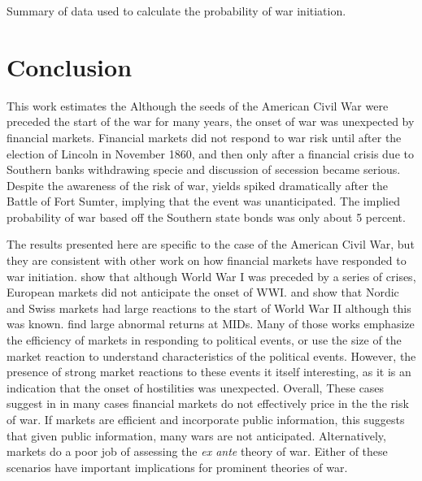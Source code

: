 \begin{table}
  \centering
  
  \caption{Summary of data used to calculate the probability of war initiation.}
\label{acw_onset:tab:prwar1}
\end{table}

\section{Conclusion}
\label{acw_onset:sec:conclusion}

This work estimates the
Although the seeds of the American Civil War were preceded the start of the war for many years, the onset of war was unexpected by financial markets.
Financial markets did not respond to war risk until after the election of Lincoln in November 1860, and then only after a financial crisis due to Southern banks withdrawing specie and discussion of secession became serious.
Despite the awareness of the risk of war, yields spiked dramatically after the Battle of Fort Sumter, implying that the event was unanticipated.
The implied probability of war based off the Southern state bonds was only about 5 percent.

The results presented here are specific to the case of the American Civil War, but they are consistent with other work on how financial markets have responded to war initiation.
\textcite{Ferguson2006} show that although World War I was preceded by a series of crises, European markets did not anticipate the onset of WWI.
\textcite{FreyKucher2000} and \textcite{WaldenstromFrey2008} show that Nordic and Swiss markets had large reactions to the start of World War II although this was known.
\textcite{GuidolinLaFerrara2010} find large abnormal returns at MIDs.
Many of those works emphasize the efficiency of markets in responding to political events, or use the size of the market reaction to understand characteristics of the political events.
However, the presence of strong market reactions to these events it itself interesting, as it is an indication that the onset of hostilities was unexpected.
Overall, These cases suggest in in many cases financial markets do not effectively price in the the risk of war.
If markets are efficient and incorporate public information, this suggests that given public information, many wars are not anticipated.
Alternatively, markets do a poor job of assessing the \textit{ex ante} theory of war.
Either of these scenarios have important implications for prominent theories of war.

